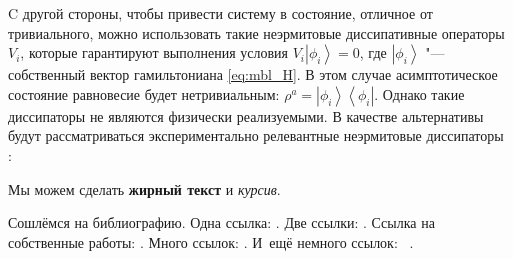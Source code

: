 C другой стороны, чтобы привести систему в состояние, отличное от тривиального, можно использовать такие неэрмитовые диссипативные операторы \(V_i\), которые гарантируют выполнения условия \(V_i \left| \phi_i \right\rangle = 0\), где \(\left| \phi_i \right\rangle\) "--- собственный вектор гамильтониана \cref{eq:mbl_H}. В этом случае асимптотическое состояние равновесие будет нетривиальным: \(\rho^a = \left| \phi_i \right\rangle \left\langle \phi_i \right| \). Однако такие диссипаторы не являются физически реализуемыми. В качестве альтернативы будут рассматриваться экспериментально релевантные неэрмитовые диссипаторы \cite{Diehl2008}:

 


Мы можем сделать \textbf{жирный текст} и \textit{курсив}.


Сошлёмся на библиографию.
Одна ссылка: \cite[с.~54]{Sokolov}\cite[с.~36]{Methodology}.
Две ссылки: \cite{Sokolov,Gaidaenko}.
Ссылка на собственные работы: \cite{Sokolov, Gaidaenko}.
Много ссылок: %
\cite{Lermontov, Management, Borozda, Marketing, Constitution, FamilyCode,
	Gost.7.0.53, Razumovski, Lagkueva, Pokrovski, Methodology, Berestova,
	Kriger}%
%
.
И~ещё немного ссылок:~\cite{Article,Book,Booklet,Conference,Inbook,Incollection,Manual,Mastersthesis,
	Misc,Phdthesis,Proceedings,Techreport,Unpublished}
\cite{medvedev2006jelektronnye, CEAT:CEAT581, doi:10.1080/01932691.2010.513279,
	Gosele1999161,Li2007StressAnalysis, Shoji199895, test:eisner-sample,
	test:eisner-sample-shorted, AB_patent_Pomerantz_1968, iofis_patent1960}
%
.

%

